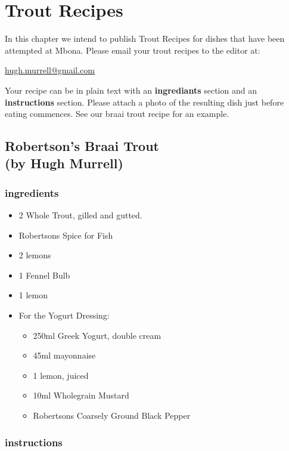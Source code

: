 \chapter{Trout Recipes}

In this chapter we intend to publish Trout Recipes for dishes that have been 
attempted at Mbona. Please email your trout recipes to the editor at:

\href{mailto:hugh.murrell@gmail.com}{hugh.murrell@gmail.com}

Your recipe can be in plain text with an {\bf ingrediants} section
and an {\bf instructions} section. Please attach a photo of the resulting
dish just before eating commences. See our braai trout recipe for an example.

\clearpage


\section{Robertson's Braai Trout \\ (by Hugh Murrell)}

\subsection*{ingredients}

\begin{itemize}
\item 2 Whole Trout, gilled and gutted.
\item Robertsons Spice for Fish
\item 2 lemons
\item 1 Fennel Bulb
\item 1 lemon
\item For the Yogurt Dressing:
\begin{itemize}
\item 250ml Greek Yogurt, double cream
\item 45ml mayonnaise
\item 1 lemon, juiced
\item 10ml Wholegrain Mustard
\item Robertsons Coarsely Ground Black Pepper
\end{itemize}
\end{itemize}

\subsection*{instructions}

